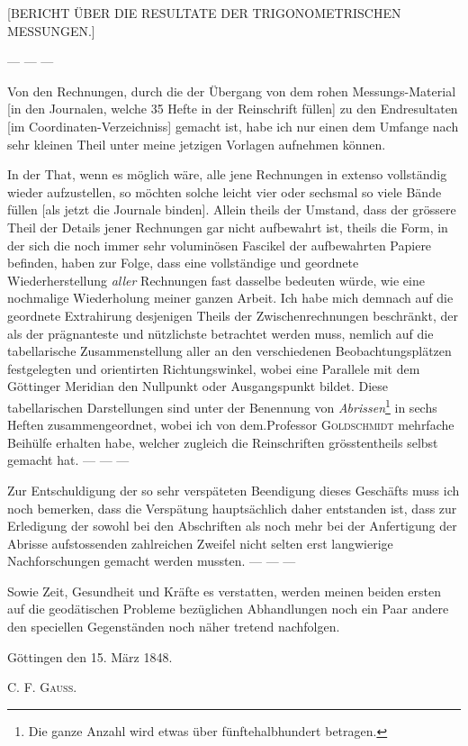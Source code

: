 \clearpage
{}%
\begin{center}\large [BERICHT ÜBER DIE RESULTATE DER TRIGONOMETRISCHEN MESSUNGEN.]\end{center}
\par
— — —

Von den Rechnungen, durch die der Übergang von dem rohen Messungs-Material [in den Journalen, welche 35 Hefte in der Reinschrift füllen] zu den Endresultaten [im Coordinaten-Verzeichniss] gemacht ist, habe ich nur einen dem Umfange nach sehr kleinen Theil unter meine jetzigen Vorlagen aufnehmen können.

In der That, wenn es möglich wäre, alle jene Rechnungen in extenso vollständig wieder aufzustellen, so möchten solche leicht vier oder sechsmal so viele Bände füllen [als jetzt die Journale binden]. Allein theils der Umstand, dass der grössere Theil der Details jener Rechnungen gar nicht aufbewahrt ist, theils die Form, in der sich die noch immer sehr voluminösen Fascikel der aufbewahrten Papiere befinden, haben zur Folge, dass eine vollständige und geordnete Wiederherstellung \textit{aller} Rechnungen fast dasselbe bedeuten würde, wie eine nochmalige Wiederholung meiner ganzen Arbeit. Ich habe mich demnach auf die geordnete Extrahirung desjenigen Theils der Zwischenrechnungen beschränkt, der als der prägnanteste und nützlichste betrachtet werden muss, nemlich auf die tabellarische Zusammenstellung aller an den verschiedenen Beobachtungsplätzen festgelegten und orientirten Richtungswinkel, wobei eine Parallele mit dem Göttinger Meridian den Nullpunkt oder Ausgangspunkt bildet. Diese tabellarischen Darstellungen sind unter der Benennung von \textit{Abrissen}\footnote{Die ganze Anzahl wird etwas über fünftehalbhundert betragen.} in sechs Heften zusammengeordnet, wobei ich von dem.Professor \textsc{Goldschmidt} mehrfache Beihülfe erhalten habe, welcher zugleich die Reinschriften grösstentheils selbst gemacht hat. — — —

Zur Entschuldigung der so sehr verspäteten Beendigung dieses Geschäfts muss ich noch bemerken, dass die Verspätung hauptsächlich daher entstanden ist, dass zur Erledigung der sowohl bei den Abschriften als noch mehr bei der Anfertigung der Abrisse aufstossenden zahlreichen Zweifel nicht selten erst langwierige Nachforschungen gemacht werden mussten. — — —

Sowie Zeit, Gesundheit und Kräfte es verstatten, werden meinen beiden ersten auf die geodätischen Probleme bezüglichen Abhandlungen noch ein Paar andere den speciellen Gegenständen noch näher tretend nachfolgen.

Göttingen den 15. März 1848.
\begin{flushright}C. F. \textsc{Gauss}.\end{flushright}
